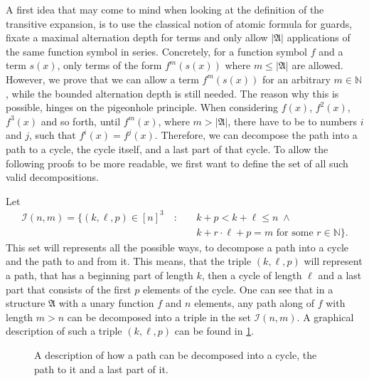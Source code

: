 A first idea that may come to mind when looking at the definition of the transitive expansion, is to use the classical notion of atomic formula for guards, fixate a maximal alternation depth for terms and only allow $\vert \mathfrak{A}\vert$ applications of the same function symbol in series.
Concretely, for a function symbol $f$ and a term $s(x)$, only terms of the form  $f^m(s(x))$ where $m\leq\vert\mathfrak A\vert$ are allowed.
However, we prove that we can allow a term $f^m(s(x))$ for an arbitrary $m\in\mathbb N$, while the bounded alternation depth is still needed.
The reason why this is possible, hinges on the pigeonhole principle.
When considering $f(x)$, $f^2(x)$, $f^3(x)$ and so forth, until $f^m(x)$, where $m>\vert\mathfrak A\vert$, there have to be to numbers $i$ and $j$, such that $f^i(x)=f^j(x)$.
Therefore, we can decompose the path into a path to a cycle, the cycle itself, and a last part of that cycle.
To allow the following proofs to be more readable, we first want to define the set of all such valid decompositions.

Let 
\begin{align*}
	\mathcal I(n,m)=\{(k,\ell,p)\in [n]^3 \quad:\quad & k+p < k+\ell \leq n \; \land \\
	& k+r\cdot \ell + p = m \text{ for some } r\in \mathbb N\}.
\end{align*}
This set will represents all the possible ways, to decompose a path into a cycle and the path to and from it.
This means, that the triple $(k,\ell,p)$ will represent a path, that has a beginning part of length $k$, then a cycle of length $\ell$ and a last part that consists of the first $p$ elements of the cycle.
One can see that in a structure $\mathfrak A$ with a unary function $f$ and $n$ elements, any path along of $f$ with length $m>n$ can be decomposed into a triple in the set $\mathcal I(n,m)$.
A graphical description of such a triple $(k,\ell,p)$ can be found in \cref{PathDecompositionPrinciple}.

\begin{figure}
	\centering
	
	\caption{A description of how a path can be decomposed into a cycle, the path to it and a last part of it.}
	\label{PathDecompositionPrinciple}
\end{figure}

